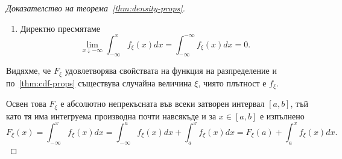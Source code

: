 \documentclass[numbers=endperiod, DIV=15, bibliography=totocnumbered]{scrartcl}
\begin{document}
\begin{proof}[Доказателство на теорема~\ref{thm:density-props}]
\begin{enumerate}
    \item Директно пресмятаме
    \begin{displaymath}
      \lim_{x \downarrow -\infty} \int_{-\infty}^x f_\xi(x) dx
      =
      \int_{-\infty}^{-\infty} f_\xi(x) dx
      =
      0.
    \end{displaymath}
  \end{enumerate}

  Видяхме, че $F_\xi$ удовлетворява свойствата на функция на разпределение и по~\ref{thm:cdf-props} съществува случайна величина $\xi$, чиято плътност е $f_\xi$.

  Освен това $F_\xi$ е абсолютно непрекъсната във всеки затворен интервал $[a, b]$, тъй като тя има интегруема производна почти навсякъде и за $x \in [a, b]$ е изпълнено
  \begin{displaymath}
    F_\xi(x)
    =
    \int_{-\infty}^x f_\xi(x) dx
    =
    \int_{-\infty}^a f_\xi(x) dx + \int_a^x f_\xi(x) dx
    =
    F_\xi(a) + \int_a^x f_\xi(x) dx.
  \end{displaymath}
\end{proof}
\end{document}
